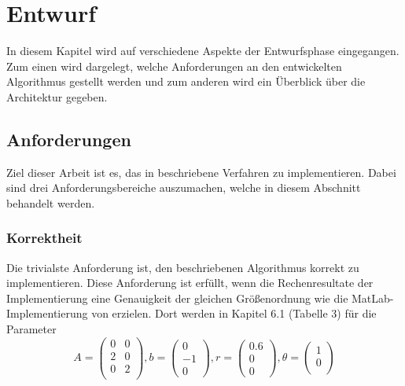 \chapter{Entwurf}\label{desgin}
In diesem Kapitel wird auf verschiedene Aspekte der Entwurfsphase eingegangen.
Zum einen wird dargelegt, welche Anforderungen an den entwickelten Algorithmus gestellt werden und zum anderen wird ein Überblick über die Architektur gegeben.

\section{Anforderungen}

Ziel dieser Arbeit ist es, das in \cite*[]{gasperini:hal-03209144} beschriebene Verfahren zu implementieren.
Dabei sind drei Anforderungsbereiche auszumachen, welche in diesem Abschnitt behandelt werden.


\subsection{Korrektheit}

Die trivialste Anforderung ist, den beschriebenen Algorithmus korrekt zu implementieren.
Diese Anforderung ist erfüllt, wenn die Rechenresultate der Implementierung eine Genauigkeit der gleichen Größenordnung wie die MatLab-Implementierung von \cite*[]{gasperini:hal-03209144} erzielen.
Dort werden in Kapitel 6.1 (Tabelle 3) für die Parameter 
\begin{equation}
    A = \begin{pmatrix}
        0 & 0 \\
        2 & 0 \\
        0 & 2 \\
    \end{pmatrix}, b = \begin{pmatrix}
        0 \\ -1 \\ 0
    \end{pmatrix},
    r = \begin{pmatrix}
        0.6 \\ 0 \\0 
    \end{pmatrix},
    \theta = \begin{pmatrix}
        1 \\ 0 \\
    \end{pmatrix}
\end{equation}

